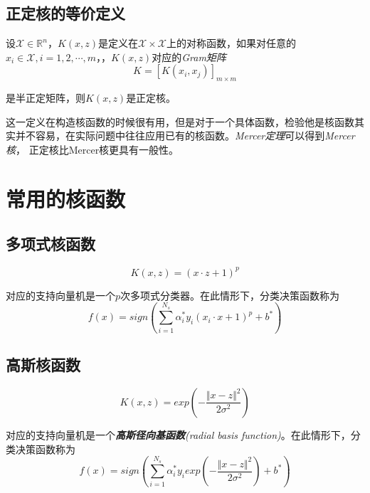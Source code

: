\subsection*{正定核的等价定义}

\begin{define}
    设$\mathcal{X}\in \mathbb{R}^n$，$K(x,z)$是定义在$\mathcal{X}\times \mathcal{X}$上的对称函数，如果对任意的
    $x_i\in \mathcal{X},i=1,2,\cdots,m$，，$K(x,z)$对应的\textsl{Gram矩阵}
    \begin{equation}
        K=[K(x_i,x_j)]_{m\times m}
    \end{equation}

    是半正定矩阵，则$K(x,z)$是正定核。
\end{define}

这一定义在构造核函数的时候很有用，但是对于一个具体函数，检验他是核函数其实并不容易，在实际问题中往往应用已有的核函数。\textsl{Mercer定理}可以得到\textsl{Mercer核}，
正定核比Mercer核更具有一般性。

\section{常用的核函数}

\subsection*{多项式核函数}

\begin{equation}
    K(x,z)=(x\cdot z+1)^p
\end{equation}

对应的支持向量机是一个$p$次多项式分类器。在此情形下，分类决策函数称为
\begin{equation}
    f(x)=sign(\sum\limits_{i=1}^{N_s}\alpha^*_iy_i(x_i\cdot x+1)^p+b^*)
\end{equation}

\subsection*{高斯核函数}

\begin{equation}
    K(x,z)=exp(-\frac{\Vert x-z\Vert^2}{2\sigma^2})
\end{equation}

对应的支持向量机是一个\textsl{\textbf{高斯径向基函数}(radial basis function)}。在此情形下，分类决策函数称为
\begin{equation}
    f(x)=sign(\sum\limits_{i=1}^{N_s}\alpha^*_iy_iexp(-\frac{\Vert x-z\Vert^2}{2\sigma^2})+b^*)
\end{equation}


